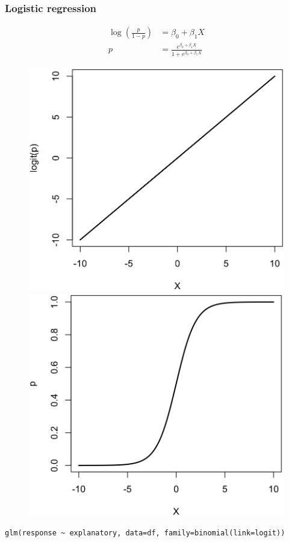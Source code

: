 \documentclass[pdf]{beamer}
\begin{document}
\begin{frame}[fragile]
\frametitle{Logistic regression}

\scriptsize
$$
\begin{aligned}
\log\left(\frac{p}{1 - p}\right) &  = \beta_0 + \beta_1 X\\
p & = \frac{e^{\beta_0 + \beta_1 X}}{1 + e^{\beta_0 + \beta_1 X}}
\end{aligned}
$$

\normalsize
\vfill

\begin{figure}
\includegraphics[width=.4\textwidth]{logit.png}
\includegraphics[width=.4\textwidth]{invlogit.png}
\end{figure}

\begin{lstlisting}[style=R]
glm(response ~ explanatory, data=df, family=binomial(link=logit))
\end{lstlisting}

\end{frame}
\end{document}
